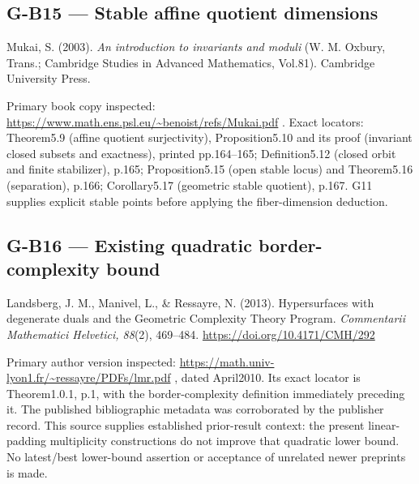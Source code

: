 \documentclass[11pt,a4paper]{article}
\theoremstyle{definition}\newtheorem{definition}{Definition}
\begin{document}
\subsection{G-B15 --- Stable affine quotient
dimensions}\label{g-b15--stable-affine-quotient-dimensions}

Mukai, S. (2003). \emph{An introduction to invariants and moduli} (W. M.
Oxbury, Trans.; Cambridge Studies in Advanced Mathematics, Vol.81).
Cambridge University Press.

Primary book copy inspected:
\url{https://www.math.ens.psl.eu/~benoist/refs/Mukai.pdf} . Exact
locators: Theorem5.9 (affine quotient surjectivity), Proposition5.10 and
its proof (invariant closed subsets and exactness), printed pp.164--165;
Definition5.12 (closed orbit and finite stabilizer), p.165;
Proposition5.15 (open stable locus) and Theorem5.16 (separation), p.166;
Corollary5.17 (geometric stable quotient), p.167. G11 supplies explicit
stable points before applying the fiber-dimension deduction.

\subsection{G-B16 --- Existing quadratic border-complexity
bound}\label{g-b16--existing-quadratic-border-complexity-bound}

Landsberg, J. M., Manivel, L., \& Ressayre, N. (2013). Hypersurfaces
with degenerate duals and the Geometric Complexity Theory Program.
\emph{Commentarii Mathematici Helvetici, 88}(2), 469--484.
\url{https://doi.org/10.4171/CMH/292}

Primary author version inspected:
\url{https://math.univ-lyon1.fr/~ressayre/PDFs/lmr.pdf} , dated
April2010. Its exact locator is Theorem1.0.1, p.1, with the
border-complexity definition immediately preceding it. The published
bibliographic metadata was corroborated by the publisher record. This
source supplies established prior-result context: the present
linear-padding multiplicity constructions do not improve that quadratic
lower bound. No latest/best lower-bound assertion or acceptance of
unrelated newer preprints is made.
\end{document}
